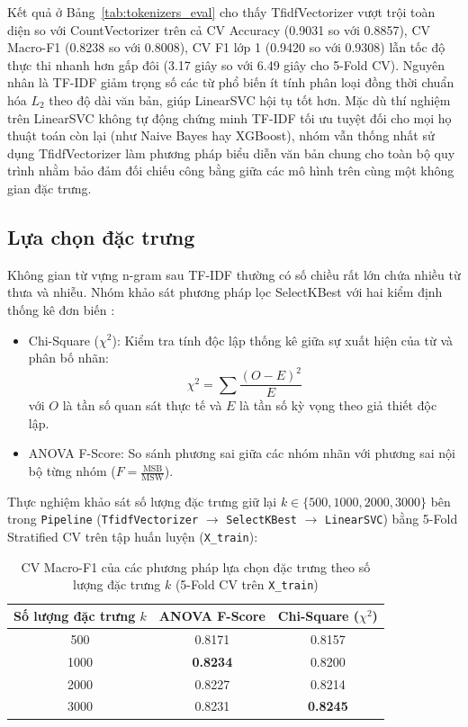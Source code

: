Kết quả ở Bảng~\ref{tab:tokenizers_eval} cho thấy TfidfVectorizer vượt trội toàn diện so với CountVectorizer trên cả CV Accuracy (0.9031 so với 0.8857), CV Macro-F1 (0.8238 so với 0.8008), CV F1 lớp 1 (0.9420 so với 0.9308) lẫn tốc độ thực thi nhanh hơn gấp đôi (3.17 giây so với 6.49 giây cho 5-Fold CV). Nguyên nhân là TF-IDF giảm trọng số các từ phổ biến ít tính phân loại đồng thời chuẩn hóa $L_2$ theo độ dài văn bản, giúp LinearSVC hội tụ tốt hơn. Mặc dù thí nghiệm trên LinearSVC không tự động chứng minh TF-IDF tối ưu tuyệt đối cho mọi họ thuật toán còn lại (như Naive Bayes hay XGBoost), nhóm vẫn thống nhất sử dụng TfidfVectorizer làm phương pháp biểu diễn văn bản chung cho toàn bộ quy trình nhằm bảo đảm đối chiếu công bằng giữa các mô hình trên cùng một không gian đặc trưng.

\subsection{Lựa chọn đặc trưng}\label{sec:feature_selection}
Không gian từ vựng n-gram sau TF-IDF thường có số chiều rất lớn chứa nhiều từ thưa và nhiễu. Nhóm khảo sát phương pháp lọc SelectKBest với hai kiểm định thống kê đơn biến \cite{yang1997}:
\begin{itemize}
    \item Chi-Square ($\chi^2$): Kiểm tra tính độc lập thống kê giữa sự xuất hiện của từ và phân bố nhãn:
    \begin{equation}
    \chi^2 = \sum \frac{(O - E)^2}{E}
    \end{equation}
    với $O$ là tần số quan sát thực tế và $E$ là tần số kỳ vọng theo giả thiết độc lập.
    \item ANOVA F-Score: So sánh phương sai giữa các nhóm nhãn với phương sai nội bộ từng nhóm ($F = \frac{\text{MSB}}{\text{MSW}}$).
\end{itemize}

Thực nghiệm khảo sát số lượng đặc trưng giữ lại $k \in \{500, 1000, 2000, 3000\}$ bên trong \texttt{Pipeline} (\texttt{TfidfVectorizer} $\rightarrow$ \texttt{SelectKBest} $\rightarrow$ \texttt{LinearSVC}) bằng 5-Fold Stratified CV trên tập huấn luyện (\texttt{X\_train}):

\begin{table}[H]
\centering
\begin{tabular}{|c|c|c|}
\hline
\textbf{Số lượng đặc trưng $k$} & \textbf{ANOVA F-Score} & \textbf{Chi-Square ($\chi^2$)} \\ \hline
500  & 0.8171 & 0.8157 \\ \hline
1000 & \textbf{0.8234} & 0.8200 \\ \hline
2000 & 0.8227 & 0.8214 \\ \hline
3000 & 0.8231 & \textbf{0.8245} \\ \hline
\end{tabular}
\caption{CV Macro-F1 của các phương pháp lựa chọn đặc trưng theo số lượng đặc trưng $k$ (5-Fold CV trên \texttt{X\_train})}
\label{tab:fs_eval}
\end{table}

